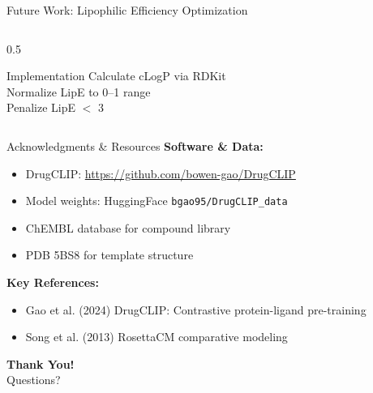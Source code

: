 \documentclass[aspectratio=169,xcolor=table]{beamer}
\begin{document}
\begin{frame}{Future Work: Lipophilic Efficiency Optimization}
\begin{columns}
\begin{column}{0.5\textwidth}
\vspace{0.2cm}

\begin{block}{Implementation}
Calculate cLogP via RDKit\\
Normalize LipE to 0--1 range\\
Penalize LipE $<$ 3
\end{block}
\end{column}
\end{columns}

\end{frame}

\begin{frame}{Acknowledgments \& Resources}
\textbf{Software \& Data:}
\begin{itemize}\setlength{\itemsep}{0pt}
    \item DrugCLIP: \url{https://github.com/bowen-gao/DrugCLIP}
    \item Model weights: HuggingFace \texttt{bgao95/DrugCLIP\_data}
    \item ChEMBL database for compound library
    \item PDB 5BS8 for template structure
\end{itemize}

\vspace{0.3cm}
\textbf{Key References:}
\begin{itemize}\setlength{\itemsep}{0pt}
    \item Gao et al. (2024) DrugCLIP: Contrastive protein-ligand pre-training
    \item Song et al. (2013) RosettaCM comparative modeling
\end{itemize}

\vspace{0.5cm}
\begin{center}
\Large\textbf{Thank You!}\\
\normalsize Questions?
\end{center}
\end{frame}
\end{document}
